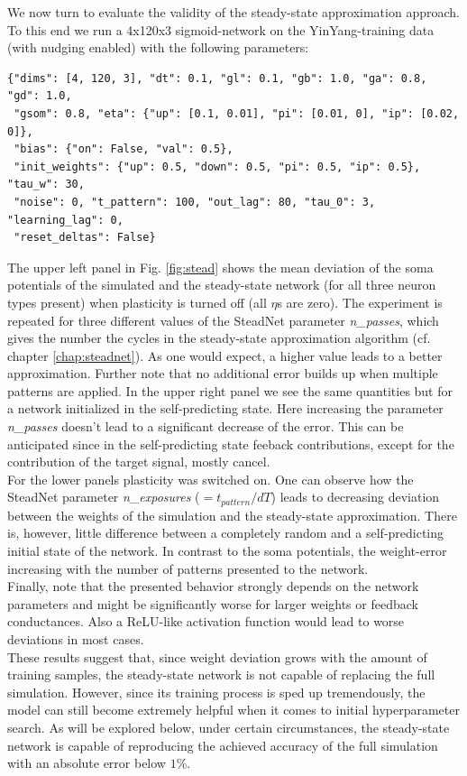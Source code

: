 \documentclass[12pt,a4paper]{article}
\begin{document}
We now turn to evaluate the validity of the steady-state approximation approach. To this end we run a 4x120x3 sigmoid-network on the YinYang-training data (with nudging enabled) with the following parameters:
\begin{verbatim}
{"dims": [4, 120, 3], "dt": 0.1, "gl": 0.1, "gb": 1.0, "ga": 0.8, "gd": 1.0,
 "gsom": 0.8, "eta": {"up": [0.1, 0.01], "pi": [0.01, 0], "ip": [0.02, 0]},
 "bias": {"on": False, "val": 0.5},
 "init_weights": {"up": 0.5, "down": 0.5, "pi": 0.5, "ip": 0.5}, "tau_w": 30,
 "noise": 0, "t_pattern": 100, "out_lag": 80, "tau_0": 3, "learning_lag": 0,
 "reset_deltas": False}
\end{verbatim}
The upper left panel in Fig. \ref{fig:stead} shows the mean deviation of the soma potentials of the simulated and the steady-state network (for all three neuron types present) when plasticity is turned off (all $\eta$s are zero). The experiment is repeated for three different values of the SteadNet parameter \textit{n\_passes}, which gives the number the cycles in the steady-state approximation algorithm (cf. chapter \ref{chap:steadnet}). As one would expect, a higher value leads to a better approximation. Further note that no additional error builds up when multiple patterns are applied. In the upper right panel we see the same quantities but for a network initialized in the self-predicting state. Here increasing the parameter \textit{n\_passes} doesn't lead to a significant decrease of the error. This can be anticipated since in the self-predicting state feeback contributions, except for the contribution of the target signal, mostly cancel.\\
For the lower panels plasticity was switched on. One can observe how the SteadNet parameter \textit{n\_exposures} ($=t_{pattern}/dT$) leads to decreasing deviation between the weights of the simulation and the steady-state approximation. There is, however, little difference between a completely random and a self-predicting initial state of the network. In contrast to the soma potentials, the weight-error increasing with the number of patterns presented to the network.\\
Finally, note that the presented behavior strongly depends on the network parameters and might be significantly worse for larger weights or feedback conductances. Also a ReLU-like activation function would lead to worse deviations in most cases.\\
These results suggest that, since weight deviation grows with the amount of training samples, the steady-state network is not capable of replacing the full simulation. However, since its training process is sped up tremendously, the model can still become extremely helpful when it comes to initial hyperparameter search. As will be explored below, under certain circumstances, the steady-state network is capable of reproducing the achieved accuracy of the full simulation with an absolute error below $1 \%$.
\end{document}
